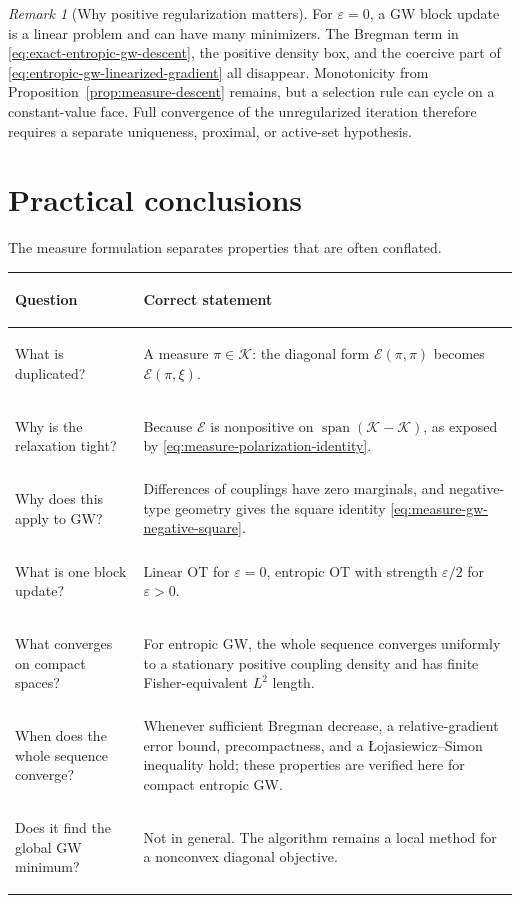 \documentclass[11pt]{article}
\theoremstyle{definition}
\theoremstyle{remark}
\newtheorem{remark}[theorem]{Remark}
\newcommand{\Kcal}{\mathcal K}
\newcommand{\Ee}{\mathcal E}
\newcommand{\Span}{\operatorname{span}}
\newcommand{\eps}{\varepsilon}
\begin{document}
\begin{remark}[Why positive regularization matters]
For \(\eps=0\), a GW block update is a linear problem and can have many
minimizers.  The Bregman term in
\eqref{eq:exact-entropic-gw-descent}, the positive density box, and the
coercive part of \eqref{eq:entropic-gw-linearized-gradient} all disappear.
Monotonicity from Proposition~\ref{prop:measure-descent} remains, but a
selection rule can cycle on a constant-value face.  Full convergence of the
unregularized iteration therefore requires a separate uniqueness, proximal,
or active-set hypothesis.
\end{remark}

\section{Practical conclusions}

The measure formulation separates properties that are often conflated.
\begin{center}
\renewcommand{\arraystretch}{1.18}
\begin{tabularx}{\linewidth}{@{}>{\bfseries\raggedright\arraybackslash}p{.31\linewidth}X@{}}
\toprule
Question & Correct statement \\
\midrule
What is duplicated? &
A measure \(\pi\in\Kcal\): the diagonal form \(\Ee(\pi,\pi)\) becomes
\(\Ee(\pi,\xi)\). \\
Why is the relaxation tight? &
Because \(\Ee\) is nonpositive on \(\Span(\Kcal-\Kcal)\), as exposed by
\eqref{eq:measure-polarization-identity}. \\
Why does this apply to GW? &
Differences of couplings have zero marginals, and negative-type geometry gives
the square identity \eqref{eq:measure-gw-negative-square}. \\
What is one block update? &
Linear OT for \(\eps=0\), entropic OT with strength \(\eps/2\) for
\(\eps>0\). \\
What converges on compact spaces? &
For entropic GW, the whole sequence converges uniformly to a stationary
positive coupling density and has finite Fisher-equivalent \(L^2\) length. \\
When does the whole sequence converge? &
Whenever sufficient Bregman decrease, a relative-gradient error bound,
precompactness, and a {\L}ojasiewicz--Simon inequality hold; these properties
are verified here for compact entropic GW. \\
Does it find the global GW minimum? &
Not in general.  The algorithm remains a local method for a nonconvex diagonal
objective. \\
\bottomrule
\end{tabularx}
\end{center}
\end{document}

